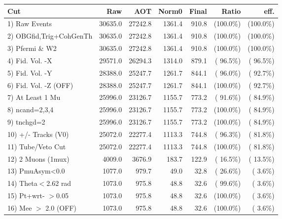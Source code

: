  \begin{table}[h!]\centering
 \begin{tabular}{||l||r|r|r|r|r|r||}
 \hline
 \hline
 Cut & Raw & AOT & Norm0 & Final & Ratio & eff.       \\
 \hline
  1) Raw Events           &      30635.0 &      27242.8 &       1361.4 &        910.8 & (100.0\%) & (100.0\%) \\
  2) OBGfid,Trig+CohGenTh &      30635.0 &      27242.8 &       1361.4 &        910.8 & (100.0\%) & (100.0\%) \\
  3) Pfermi \& W2         &      30635.0 &      27242.8 &       1361.4 &        910.8 & (100.0\%) & (100.0\%) \\
  4) Fid. Vol. -X         &      29571.0 &      26294.3 &       1314.0 &        879.1 & ( 96.5\%) & ( 96.5\%) \\
  5) Fid. Vol. -Y         &      28388.0 &      25247.7 &       1261.7 &        844.1 & ( 96.0\%) & ( 92.7\%) \\
  6) Fid. Vol. -Z (OFF)   &      28388.0 &      25247.7 &       1261.7 &        844.1 & (100.0\%) & ( 92.7\%) \\
  7) At Least 1 Mu        &      25996.0 &      23126.7 &       1155.7 &        773.2 & ( 91.6\%) & ( 84.9\%) \\
  8) ncand=2,3,4          &      25996.0 &      23126.7 &       1155.7 &        773.2 & (100.0\%) & ( 84.9\%) \\
  9) tnchgd=2             &      25996.0 &      23126.7 &       1155.7 &        773.2 & (100.0\%) & ( 84.9\%) \\
 10) +/- Tracks (V0)      &      25072.0 &      22277.4 &       1113.3 &        744.8 & ( 96.3\%) & ( 81.8\%) \\
 11) Tube/Veto Cut        &      25072.0 &      22277.4 &       1113.3 &        744.8 & (100.0\%) & ( 81.8\%) \\
 12) 2 Muons (1mux)       &       4009.0 &       3676.9 &        183.7 &        122.9 & ( 16.5\%) & ( 13.5\%) \\
 13) PmuAsym<0.0          &       1077.0 &        979.7 &         49.0 &         32.8 & ( 26.6\%) & (  3.6\%) \\
 14) Theta$<$2.62 rad     &       1073.0 &        975.8 &         48.8 &         32.6 & ( 99.6\%) & (  3.6\%) \\
 15) Pt+wrt- $>$0.05      &       1073.0 &        975.8 &         48.8 &         32.6 & (100.0\%) & (  3.6\%) \\
 16) Mee $>$ 2.0  (OFF)   &       1073.0 &        975.8 &         48.8 &         32.6 & (100.0\%) & (  3.6\%) \\

\end{tabular}
\end{table}
